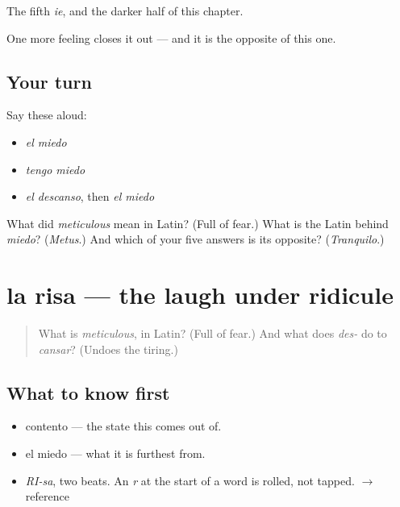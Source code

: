 \begin{grammarlens}[title={What you've built}]
The fifth \emph{ie}, and the darker half of this chapter.

One more feeling closes it out — and it is the opposite of this one.
\end{grammarlens}

\subsection*{Your turn}
Say these aloud:

\begin{itemize}
\raggedright
  \item \emph{el miedo}
  \item \emph{tengo miedo}
  \item \emph{el descanso}, then \emph{el miedo}
\end{itemize}

\begin{tcolorbox}[breakable,colback=teal!4,colframe=teal!35!black,title={Before you move on}]
What did \emph{meticulous} mean in Latin? (Full of fear.) What is the Latin behind \emph{miedo}? (\emph{Metus}.) And which of your five answers is its opposite? (\emph{Tranquilo}.)
\end{tcolorbox}
\section[la risa]{la risa — the laugh under ridicule}

\label{lesson:ES-C315-risa}



\begin{quote}
What is \emph{meticulous}, in Latin? (Full of fear.) And what does \emph{des-} do to \emph{cansar}? (Undoes the tiring.)
\end{quote}

\subsection*{What to know first}
\begin{itemize}
\raggedright
  \item contento — the state this comes out of.
  \item el miedo — what it is furthest from.
\end{itemize}

\begin{sounds}
\begin{itemize}
\raggedright
  \item \emph{RI-sa}, two beats. An \emph{r} at the start of a word is rolled, not tapped. $\to$ reference
\end{itemize}
\end{sounds}

